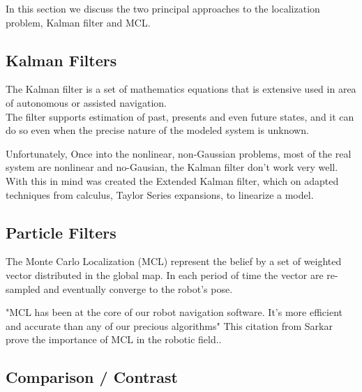 \documentclass[10pt,journal,compsoc]{IEEEtran}
\begin{document}
In this section we discuss the two principal approaches to the localization problem, Kalman filter and MCL.

\subsection{Kalman Filters}

The Kalman filter is a set of mathematics equations that is extensive used in area of autonomous or assisted
navigation.\\
The filter supports estimation of past, presents and even future states, and it can do so even when the precise nature
of the modeled system is unknown\cite{Welch1997}.

Unfortunately, Once into the nonlinear, non-Gaussian problems, most of the real system are nonlinear and no-Gausian, the
Kalman filter don't work very well. With this in mind was created the Extended Kalman filter, which on adapted
techniques from calculus, Taylor Series expansions, to linearize a model. 

\subsection{Particle Filters}

The Monte Carlo Localization (MCL) represent the belief by a set of weighted vector distributed in the global map. In
each period of time the vector are re-sampled and eventually converge to the robot's pose.


"MCL has been at the core of our robot navigation software. It's more efficient and accurate than any of our precious
algorithms" This citation from Sarkar prove the importance of MCL in the robotic field.\cite{Sarkar2009}.
\subsection{Comparison / Contrast}
\end{document}
